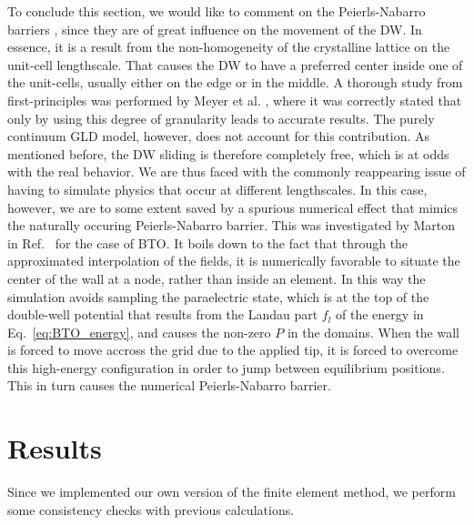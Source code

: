 To conclude this section, we would like to comment on the Peierls-Nabarro barriers \cite{Peierls1940,Nabarro1947}, since they are of great influence on the movement of the DW.
In essence, it is a result from the non-homogeneity of the crystalline lattice on the unit-cell lengthscale.
That causes the DW to have a preferred center inside one of the unit-cells, usually either on the edge or in the middle.
A thorough study from first-principles was performed by Meyer et al. \cite{Meyer2002}, where it was correctly stated that only by using this degree of granularity leads to accurate results.
The purely continuum GLD model, however, does not account for this contribution.
As mentioned before, the DW sliding is therefore completely free, which is at odds with the real behavior.
We are thus faced with the commonly reappearing issue of having to simulate physics that occur at different lengthscales.
In this case, however, we are to some extent saved by a spurious numerical effect that mimics the naturally occuring Peierls-Nabarro barrier.
This was investigated by Marton in Ref.~\cite{Marton2018} for the case of BTO.
It boils down to the fact that through the approximated interpolation of the fields, it is numerically favorable to situate the center of the wall at a node, rather than inside an element.
In this way the simulation avoids sampling the paraelectric state, which is at the top of the double-well potential that results from the Landau part $f_l$ of the energy in Eq.~\ref{eq:BTO_energy}, and causes the non-zero $P$ in the domains.
When the wall is forced to move accross the grid due to the applied tip, it is forced to overcome this high-energy configuration in order to jump between equilibrium positions.
This in turn causes the numerical Peierls-Nabarro barrier.

\section{Results}
Since we implemented our own version of the finite element method, we perform some consistency checks with previous calculations.

